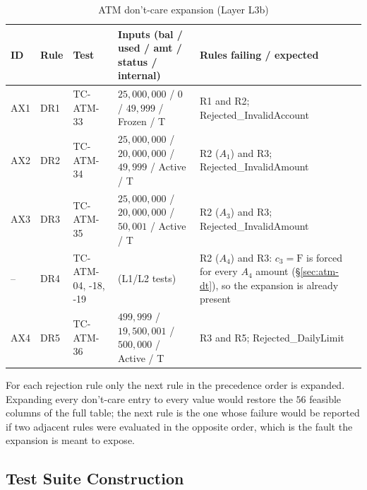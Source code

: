 \documentclass[11pt,a4paper]{article}
\begin{document}
\begin{table}[H]
\centering
\caption{ATM don't-care expansion (Layer L3b)}
\label{tab:atm-dontcare}
\small
\begin{tabularx}{\textwidth}{l l l L{3.4cm} Y}
\toprule
ID & Rule & Test & Inputs (bal / used / amt / status / internal) & Rules failing / expected \\
\midrule
AX1 & DR1 & TC-ATM-33 & \(25{,}000{,}000\) / \(0\) / \(49{,}999\) / Frozen / T & R1 and R2; Rejected\_InvalidAccount \\
AX2 & DR2 & TC-ATM-34 & \(25{,}000{,}000\) / \(20{,}000{,}000\) / \(49{,}999\) / Active / T & R2 (\(A_1\)) and R3; Rejected\_InvalidAmount \\
AX3 & DR3 & TC-ATM-35 & \(25{,}000{,}000\) / \(20{,}000{,}000\) / \(50{,}001\) / Active / T & R2 (\(A_3\)) and R3; Rejected\_InvalidAmount \\
-- & DR4 & TC-ATM-04, -18, -19 & (L1/L2 tests) & R2 (\(A_4\)) and R3: \(c_3=\mathrm{F}\) is forced for every \(A_4\) amount (\S\ref{sec:atm-dt}), so the expansion is already present \\
AX4 & DR5 & TC-ATM-36 & \(499{,}999\) / \(19{,}500{,}001\) / \(500{,}000\) / Active / T & R3 and R5; Rejected\_DailyLimit \\
\bottomrule
\end{tabularx}
\end{table}

For each rejection rule only the next rule in the precedence order is
expanded. Expanding every don't-care entry to every value would restore the
\(56\) feasible columns of the full table; the next rule is the one whose
failure would be reported if two adjacent rules were evaluated in the
opposite order, which is the fault the expansion is meant to expose.
\subsection{Test Suite Construction}
\label{sec:atm-suite}
\end{document}
